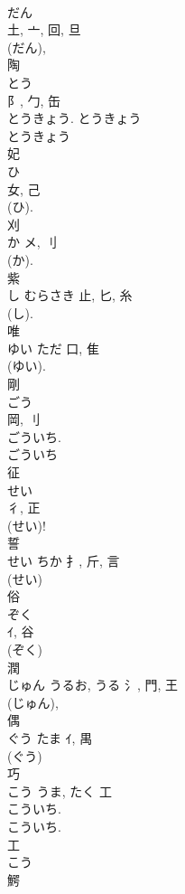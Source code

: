 \documentclass[8pt]{extreport}
\begin{document}
\begin{CJK}{UTF8}{min}
\\	だん	
\\	土, 亠, 回, 旦	
\\	(だん), 
\\	陶	
\\	とう	
\\	阝, 勹, 缶	
\\	とうきょう. とうきょう 
\\	とうきょう 
\\	妃	
\\	ひ	
\\	女, 己	
\\	(ひ). 
\\	刈	
\\	か	メ, 刂	
\\	(か). 
\\	紫	
\\	し	むらさき	止, 匕, 糸	
\\	(し).	
\\	唯	
\\	ゆい	ただ	口, 隹	
\\	(ゆい). 
\\	剛	
\\	ごう	
\\	岡, 刂	
\\	ごういち.	
\\	ごういち 
\\	征	
\\	せい	
\\	彳, 正	
\\	(せい)! 
\\	誓	
\\	せい	ちか	扌, 斤, 言	
\\	(せい) 
\\	俗	
\\	ぞく	
\\	ｲ, 谷	
\\	(ぞく) 
\\	潤	
\\	じゅん	うるお, うる	氵, 門, 王	
\\	(じゅん), 
\\	偶	
\\	ぐう	たま	ｲ, 禺	
\\	(ぐう) 
\\	巧	
\\	こう	うま, たく	工		
\\	こういち.
\\	こういち. 
\\	工 
\\	こう 
\\	鰐	

\end{CJK}
\end{document}
